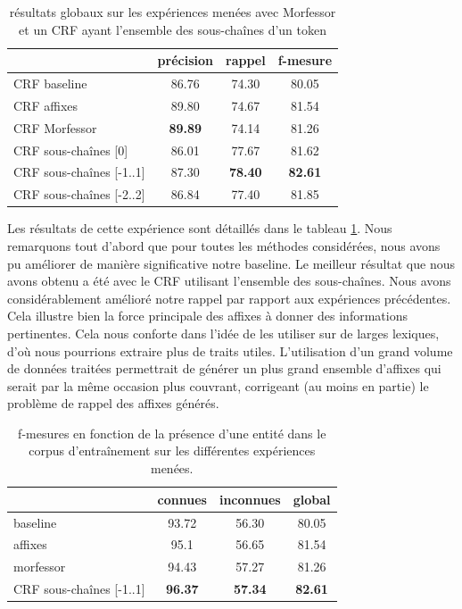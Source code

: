 \documentclass[12pt,a4paper,times,twoside,openright]{report}
\begin{document}
\begin{table}[ht!]
\centering
\begin{tabular}{|l|ccc|}
\cline{2-4}
\multicolumn{1}{l|}{}   & précision      & rappel         & f-mesure \\
\hline
CRF baseline            & 86.76          & 74.30          & 80.05 \\
CRF affixes             & 89.80          & 74.67          & 81.54 \\
\hline
CRF Morfessor           & \textbf{89.89} & 74.14          & 81.26 \\
\hline
CRF sous-chaînes [0]     & 86.01          & 77.67          & 81.62 \\
CRF sous-chaînes [-1..1] & 87.30          & \textbf{78.40} & \textbf{82.61} \\
CRF sous-chaînes [-2..2] & 86.84          & 77.40          & 81.85 \\
\hline
\end{tabular}
\caption{résultats globaux sur les expériences menées avec Morfessor et un CRF ayant l'ensemble des sous-chaînes d'un token}
\label{tab:ML-morpho-PRF}
\end{table}

Les résultats de cette expérience sont détaillés dans le tableau \ref{tab:ML-morpho-PRF}. Nous remarquons tout d'abord que pour toutes les méthodes considérées, nous avons pu améliorer de manière significative notre baseline. Le meilleur résultat que nous avons obtenu a été avec le CRF utilisant l'ensemble des sous-chaînes. Nous avons considérablement amélioré notre rappel par rapport aux expériences précédentes. Cela illustre bien la force principale des affixes à donner des informations pertinentes. Cela nous conforte dans l'idée de les utiliser sur de larges lexiques, d'où nous pourrions extraire plus de traits utiles. L'utilisation d'un grand volume de données traitées permettrait de générer un plus grand ensemble d'affixes qui serait par la même occasion plus couvrant, corrigeant (au moins en partie) le problème de rappel des affixes générés.

\begin{table}[ht!]
\centering
\begin{tabular}{|l|ccc|}
\cline{2-4}
\multicolumn{1}{l|}{}      & connues        & inconnues      & global \\
\hline
baseline                   & 93.72          & 56.30          & 80.05 \\
affixes                    & 95.1           & 56.65          & 81.54 \\
morfessor                  & 94.43          & 57.27          & 81.26 \\
CRF sous-chaînes [-1..1] & \textbf{96.37} & \textbf{57.34} & \textbf{82.61} \\
\hline
\end{tabular}
\caption{f-mesures en fonction de la présence d'une entité dans le corpus d'entraînement sur les différentes expériences menées.}
\label{tab:ML-morpho-fscores}
\end{table}
\end{document}
